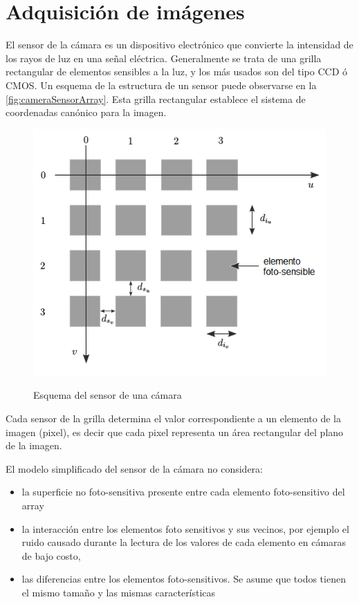 \section{Adquisición de imágenes}
El sensor de la cámara es un dispositivo electrónico que convierte la intensidad de los rayos de luz en una señal eléctrica. Generalmente se trata de una grilla rectangular de elementos sensibles a la luz, y los más usados son del tipo \ac{CCD} ó \ac{CMOS}. Un esquema de la estructura de un sensor puede observarse en la \autoref{fig:cameraSensorArray}. Esta grilla rectangular establece el sistema de coordenadas canónico para la imagen.
\begin{figure}[bth]
    \myfloatalign
        {\includegraphics[width=0.8\linewidth]{images/cameraSensorArray}}
        \caption{Esquema del sensor de una cámara}
        \label{fig:cameraSensorArray}
\end{figure}

Cada sensor de la grilla determina el valor correspondiente a un elemento de la imagen (pixel), es decir que cada pixel representa un área rectangular del plano de la imagen.

El modelo simplificado del sensor de la cámara no considera:
\begin{itemize}
    \item la superficie no foto-sensitiva presente entre cada elemento foto-sensitivo del array
    \item la interacción entre los elementos foto sensitivos y sus vecinos, por ejemplo el ruido causado durante la lectura de los valores de cada elemento en cámaras de bajo costo,
    \item las diferencias entre los elementos foto-sensitivos. Se asume que todos tienen el mismo tamaño y las mismas características     
\end{itemize}

